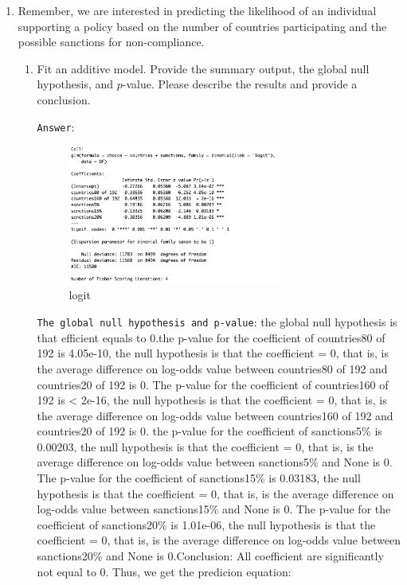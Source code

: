 \documentclass[12pt,letterpaper]{article}
\begin{document}
\begin{enumerate}
	\item
	Remember, we are interested in predicting the likelihood of an individual supporting a policy based on the number of countries participating and the possible sanctions for non-compliance.
	\begin{enumerate}
		\item [] Fit an additive model. Provide the summary output, the global null hypothesis, and $p$-value. Please describe the results and provide a conclusion.
		
		\vspace{3cm}
		
		\texttt{Answer}:
		
		\vspace{.5cm}
		
		 
		
		\begin{figure}[H] 
			\includegraphics[width=0.7\textwidth]{logit1.png} 
			\caption{logit} 
		\end{figure}
		
		\vspace{.5cm}
	\texttt{The global null hypothesis and p-value}: the global null hypothesis is that efficient equals to 0.the p-value for the coefficient of countries80 of 192 is 4.05e-10, the null hypothesis is that the coefficient = 0, that is, is the average difference on log-odds value between countries80 of 192 and countries20 of 192 is 0. The p-value for the coefficient of countries160 of 192 is < 2e-16, the null hypothesis is that the coefficient = 0, that is, is the average difference on log-odds value between countries160 of 192 and countries20 of 192 is 0. the p-value for the coefficient of sanctions5\%  is 0.00203, the null hypothesis is  that the coefficient = 0, that is, is the average difference on log-odds value between sanctions5\% and None is 0. The p-value for the coefficient of sanctions15\%  is 0.03183, the null hypothesis is  that the coefficient = 0, that is, is the average difference on log-odds value between sanctions15\% and None is 0. The p-value for the coefficient of sanctions20\%  is 1.01e-06, the null hypothesis is  that the coefficient = 0, that is, is the average difference on log-odds value between sanctions20\% and None is 0.Conclusion: All coefficient are significantly not equal to 0. Thus, we get the predicion equation:
		

\end{enumerate}
\end{enumerate}
\end{document}
